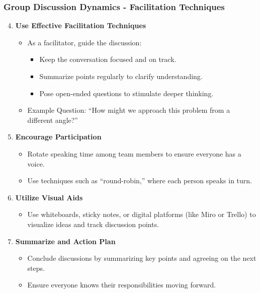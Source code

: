 \documentclass{beamer}
\begin{document}
\begin{frame}[fragile]
    \frametitle{Group Discussion Dynamics - Facilitation Techniques}
    \begin{enumerate}
        \setcounter{enumi}{3}
        \item \textbf{Use Effective Facilitation Techniques}
            \begin{itemize}
                \item As a facilitator, guide the discussion:
                \begin{itemize}
                    \item Keep the conversation focused and on track.
                    \item Summarize points regularly to clarify understanding.
                    \item Pose open-ended questions to stimulate deeper thinking.
                \end{itemize}
                \item Example Question: ``How might we approach this problem from a different angle?''
            \end{itemize}
        \item \textbf{Encourage Participation}
            \begin{itemize}
                \item Rotate speaking time among team members to ensure everyone has a voice.
                \item Use techniques such as ``round-robin,'' where each person speaks in turn.
            \end{itemize}
        \item \textbf{Utilize Visual Aids}
            \begin{itemize}
                \item Use whiteboards, sticky notes, or digital platforms (like Miro or Trello) to visualize ideas and track discussion points.
            \end{itemize}
        \item \textbf{Summarize and Action Plan}
            \begin{itemize}
                \item Conclude discussions by summarizing key points and agreeing on the next steps. 
                \item Ensure everyone knows their responsibilities moving forward.
            \end{itemize}
    \end{enumerate}
\end{frame}
\end{document}
